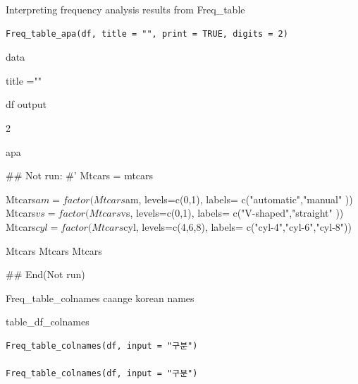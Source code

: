 \documentclass[a4paper]{book}
\begin{document}
%
\begin{Description}
Interpreting frequency analysis results from Freq\_table
\end{Description}
%
\begin{Usage}
\begin{verbatim}
Freq_table_apa(df, title = "", print = TRUE, digits = 2)
\end{verbatim}
\end{Usage}
%
\begin{Arguments}
\begin{ldescription}
\item[\code{df}] data

\item[\code{title}] title =""

\item[\code{print}] df output

\item[\code{digits}] 2
\end{ldescription}
\end{Arguments}
%
\begin{Value}
apa
\end{Value}
%
\begin{Examples}
\begin{ExampleCode}

## Not run: 
#'
Mtcars = mtcars

Mtcars$am = factor(Mtcars$am, levels=c(0,1), labels= c("automatic","manual" ))
Mtcars$vs  = factor(Mtcars$vs, levels=c(0,1), labels= c("V-shaped","straight" ))
Mtcars$cyl  = factor(Mtcars$cyl, levels=c(4,6,8), labels= c("cyl-4","cyl-6","cyl-8"))

Mtcars %
Mtcars %
Mtcars %

## End(Not run)

\end{ExampleCode}
\end{Examples}
%
\begin{Description}
Freq\_table\_colnames caange korean names

table\_df\_colnames
\end{Description}
%
\begin{Usage}
\begin{verbatim}
Freq_table_colnames(df, input = "구분")

Freq_table_colnames(df, input = "구분")
\end{verbatim}
\end{Usage}
\end{document}
